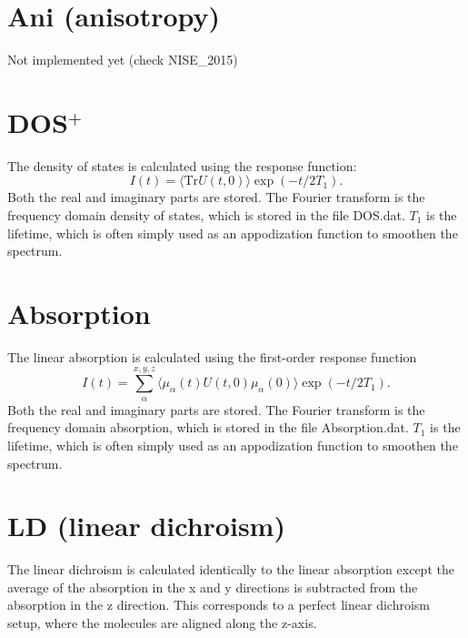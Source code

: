 \section{Ani (anisotropy)}
Not implemented yet (check NISE\_2015)

\section{DOS$^{+}$}
The density of states is calculated using the response function:
\begin{equation}
	I(t)=\langle\textrm{Tr}U(t,0)\rangle\exp(-t/2T_1).
\end{equation}
Both the real and imaginary parts are stored. The Fourier transform is the frequency
domain density of states, which is stored in the file DOS.dat. $T_1$ is the lifetime,
which is often simply used as an appodization function to smoothen the spectrum.

\section{Absorption}
The linear absorption is calculated using the first-order response function
\cite{Jansen.2006.JPCB.110.22910}
\begin{equation}
	I(t)=\sum_{\alpha}^{x,y,z}\langle\mu_{\alpha}(t)U(t,0)\mu_{\alpha}(0)\rangle\exp(-t/2T_1).
\end{equation}
Both the real and imaginary parts are stored. The Fourier transform is the frequency
domain absorption, which is stored in the file Absorption.dat. $T_1$ is the lifetime,
which is often simply used as an appodization function to smoothen the spectrum. 

\section{LD (linear dichroism)}
The linear dichroism is calculated identically to the linear absorption except the
average of the absorption in the x and y directions is subtracted from the absorption
in the z direction. This corresponds to a perfect linear dichroism setup, where the
molecules are aligned along the z-axis.

